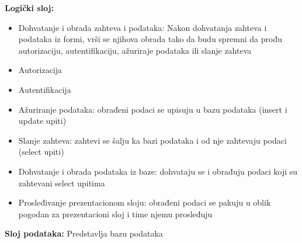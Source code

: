\documentclass[a4paper]{article}
\begin{document}
    \textbf{Logički sloj:}
    \begin{itemize}
        \item Dohvatanje i obrada zahteva i podataka: Nakon dohvatanja zahteva i podataka iz formi, vrši se njihova obrada tako da budu spremni da prođu autorizaciju, autentifikaciju, ažuriraje podataka ili slanje zahteva
        \item Autorizacija
        \item Autentifikacija
        \item Ažuriranje podataka: obrađeni podaci se upisuju u bazu podataka (insert i update upiti)
        \item Slanje zahteva: zahtevi se šalju ka bazi podataka i od nje zahtevaju podaci (select upiti)
        \item Dohvatanje i obrada podataka iz baze: dohvataju se i obrađuju podaci koji su zahtevani select upitima
        \item Prosleđivanje prezentacionom sloju: obrađeni podaci se pakuju u oblik pogodan za prezentacioni sloj i time njemu prosleđuju
    \end{itemize}
    
    \textbf{Sloj podataka:} Predstavlja bazu podataka
    
\newpage

\appendix
 

    
\end{document}
